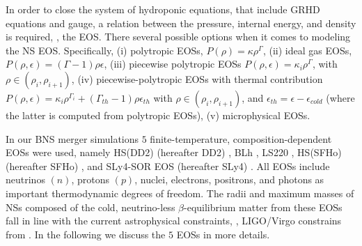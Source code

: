 In order to close the system of hydroponic equations, that include \ac{GRHD} 
equations and gauge, a relation between the pressure, 
internal energy, and density is required, \ie, the \ac{EOS}. 
%
There several possible options when it comes to modeling the \ac{NS} \ac{EOS}. 
Specifically, 
(i) polytropic \acp{EOS}, $P(\rho)=\kappa\rho^{\Gamma}$, 
(ii) ideal gas \acp{EOS}, $P(\rho,\epsilon)=(\Gamma-1)\rho\epsilon$, 
(iii) piecewise polytropic \acp{EOS} $P(\rho,\epsilon) = \kappa_i\rho^{\Gamma}$, 
with $\rho\in(\rho_i,\rho_{i+1})$, 
(iv) piecewise-polytropic \acp{EOS} with thermal contribution 
$P(\rho,\epsilon)=\kappa_i\rho^{\Gamma_i} + (\Gamma_{th}-1)\rho\epsilon_{th}$ 
with $\rho\in(\rho_i,\rho_{i+1})$, and $\epsilon_{th}=\epsilon-\epsilon_{cold}$ 
(where the latter is computed from polytropic \acp{EOS}), 
(v) microphysical \acp{EOS}.


In our \ac{BNS} merger simulations $5$ finite-temperature, composition-dependent \acp{EOS} were used, 
namely 
HS(DD2) (hereafter DD2) \citep{Typel:2009sy,Hempel:2009mc}, 
BLh \citep{Bombaci:2018ksa,Logoteta:2020yxf}, 
LS220 \citep{Lattimer:1991nc}, 
HS(SFHo) (hereafter SFHo) \citep{Steiner:2012rk}, and 
SLy4-SOR EOS (hereafter SLy4) \citep{daSilvaSchneider:2017jpg}.
%
All \acp{EOS} include neutrinos $(n)$, protons $(p)$, nuclei, electrons, positrons, and photons
as important thermodynamic degrees of freedom.
%
The radii and maximum masses of \acp{NS} composed of the cold, neutrino-less 
$\beta$-equilibrium matter from these \acp{EOS} fall in line with the current 
astrophysical constraints, \eg, LIGO/Virgo constrains from \GW{} 
\citep{TheLIGOScientific:2017qsa,Abbott:2018wiz,De:2018uhw,Abbott:2018exr}. 
%
In the following we discuss the $5$ \acp{EOS} in more details.

